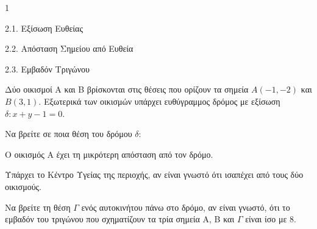 \begin{ylh}{1}
    \item 2.1. Εξίσωση Ευθείας
    \item 2.2. Απόσταση Σημείου από Ευθεία
    \item 2.3. Εμβαδόν Τριγώνου
\end{ylh}
Δύο οικισμοί Α και Β βρίσκονται στις θέσεις που ορίζουν τα σημεία $A(-1, -2)$ και $B(3,1)$. Εξωτερικά των οικισμών υπάρχει ευθύγραμμος δρόμος με εξίσωση $\delta: x + y - 1 = 0$.
\begin{alist}
\item Να βρείτε σε ποια θέση του δρόμου $\delta$:
    \begin{rlist}
    \item Ο οικισμός Α έχει τη μικρότερη απόσταση από τον δρόμο. 
    \item Υπάρχει το Κέντρο Υγείας της περιοχής, αν είναι γνωστό ότι ισαπέχει από τους δύο οικισμούς. 
    \end{rlist}
\item Να βρείτε τη θέση $\Gamma$ ενός αυτοκινήτου πάνω στο δρόμο, αν είναι γνωστό, ότι το εμβαδόν του τριγώνου που σχηματίζουν τα τρία σημεία Α, Β και $\Gamma$ είναι ίσο με 8. 
\end{alist}